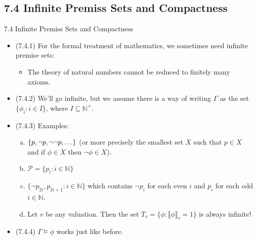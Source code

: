 \documentclass[../slides.tex]{subfiles}
\begin{document}
\subsection{7.4 Infinite Premiss Sets and Compactness}

\begin{frame}{7.4 Infinite Premiss Sets and Compactness}

	\begin{itemize}
	
		\item (7.4.1) For the formal treatment of mathematics, we sometimes need infinite premise sets:
		\begin{itemize}
		
			\item The theory of natural numbers cannot be reduced to finitely many axioms.
		
		\end{itemize}
		
		\item (7.4.2) We'll go infinite, but we assume there is a way of writing $\Gamma$ as the set $\{\phi_i:i\in I\}$, where $I\subseteq\mathbb{N}^+$.
		
		\item (7.4.3) Examples:
		
			\begin{enumerate}[(a)]
		
			\item $\{p, \neg p, \neg\neg p, \mathellipsis\}$ (or more precisely the smallest set $X$ such that $p\in X$ and if $\phi\in X$ then $\neg \phi\in X$).
			
			
			\item $\mathcal{P}=\{p_i: i\in \mathbb{N}\}$
						
			\item $\{\neg p_{2i}, p_{2i+1}: i\in\mathbb{N}\}$ which contains $\neg p_i$ for each even $i$ and $p_i$ for each odd $i\in\mathbb{N}$.
			
			\item Let $v$ be any valuation. Then the set $T_v=\{\phi:\llbracket\phi\rrbracket_v=1\}$ is always infinite! 
					
		\end{enumerate}
		
		\item (7.4.4) $\Gamma\vDash\phi$ works just like before.
	
	\end{itemize}

\end{frame}
\end{document}
